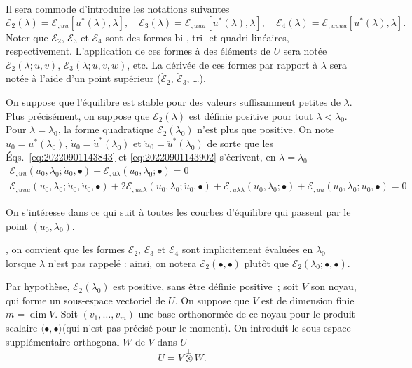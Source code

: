 \documentclass[12pt, final]{scrartcl}
\theoremstyle{definition}
\newcommand{\E}{\mathcal E}
\begin{document}
Il sera commode d'introduire les notations suivantes
\begin{equation}
  \E_2(\lambda) = \E_{,uu}[u^{\ast}(\lambda), \lambda], \quad \E_3(\lambda) = \E_{,uuu}[u^{\ast}(\lambda), \lambda], \quad \E_4(\lambda) = \E_{,uuuu} [u^{\ast}(\lambda), \lambda].
\end{equation}
Noter que $\E_2$, $\E_3$ et $\E_4$ sont des formes bi-, tri- et
quadri-linéaires, respectivement. L'application de ces formes à des éléments de
$U$ sera notée $\E_2(\lambda; u, v)$, $\E_3(\lambda; u, v, w)$, etc. La dérivée de ces
formes par rapport à $\lambda$ sera notée à l'aide d'un point supérieur
($\dot{\E}_2$, $\dot{\E}_3$, \dots).

On suppose que l'équilibre est stable pour des valeurs suffisamment petites de
$\lambda$. Plus précisément, on suppose que $\E_2(\lambda)$ est définie positive pour tout
$\lambda < \lambda_0$. Pour $\lambda = \lambda_0$, la forme quadratique $\E_2(\lambda_0)$ n'est plus que
positive. On note $u_0 = u^{\ast}(\lambda_0)$, $\dot{u}_0 = \dot{u}^\ast(\lambda_0)$ et
$\ddot{u}_0 = \ddot{u}^\ast(\lambda_0)$ de sorte que les
Éqs.~\eqref{eq:20220901143843} et \eqref{eq:20220901143902} s'écrivent, en
$\lambda = \lambda_0$
\begin{gather}
  \label{eq:20220901144331}
  \E_{,uu}(u_0, \lambda_0; \dot{u}_0, \bullet) + \E_{,u\lambda}(u_0, \lambda_0; \bullet) = 0\\
  \label{eq:20220901144335}
  \E_{,uuu}(u_0, \lambda_0; \dot{u}_0, \dot{u}_0, \bullet) + 2\E_{,uu\lambda}(u_0, \lambda_0; \dot{u}_0, \bullet) + \E_{,u\lambda\lambda}(u_0, \lambda_0; \bullet) + \E_{,uu}(u_0, \lambda_0; \ddot{u}_0, \bullet) = 0
\end{gather}

On s'intéresse dans ce qui suit à toutes les courbes d'équilibre qui passent par
le point $(u_0, \lambda_0)$.

, on
convient que les formes $\E_2$, $\E_3$ et $\E_4$ sont implicitement évaluées en
$\lambda_0$ lorsque $\lambda$ n'est pas rappelé : ainsi, on notera $\E_2(\bullet, \bullet)$ plutôt
que $\E_2(\lambda_0 ; \bullet, \bullet)$.

Par hypothèse, $\E_2(\lambda_0)$ est positive, sans être définie
positive~; soit $V$ son noyau, qui forme un sous-espace vectoriel de $U$. On
suppose que $V$ est de dimension finie $m = \dim V$. Soit
$(v_1, \ldots, v_m)$ une base orthonormée de ce noyau pour le produit scalaire
$\langle \bullet, \bullet \rangle$(qui n'est pas précisé pour le moment). On introduit le
sous-espace supplémentaire orthogonal $W$ de $V$ dans $U$
\begin{equation}
  U = V \overset{\perp}{\otimes} W.
\end{equation}
\end{document}

